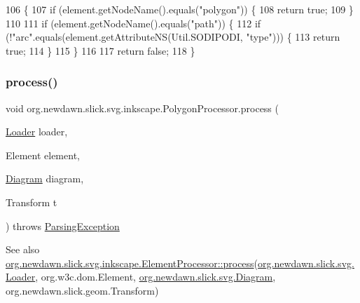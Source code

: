 \begin{DoxyCode}
106                                             \{
107         \textcolor{keywordflow}{if} (element.getNodeName().equals(\textcolor{stringliteral}{"polygon"})) \{
108             \textcolor{keywordflow}{return} \textcolor{keyword}{true};
109         \}
110         
111         \textcolor{keywordflow}{if} (element.getNodeName().equals(\textcolor{stringliteral}{"path"})) \{
112             \textcolor{keywordflow}{if} (!\textcolor{stringliteral}{"arc"}.equals(element.getAttributeNS(Util.SODIPODI, \textcolor{stringliteral}{"type"}))) \{
113                 \textcolor{keywordflow}{return} \textcolor{keyword}{true};
114             \}
115         \}
116         
117         \textcolor{keywordflow}{return} \textcolor{keyword}{false};
118     \}
\end{DoxyCode}
\mbox{\label{classorg_1_1newdawn_1_1slick_1_1svg_1_1inkscape_1_1_polygon_processor_afe4b2aaaa0651a682fad619a9dddf870}} 
\subsubsection{\texorpdfstring{process()}{process()}}
{\footnotesize\ttfamily void org.\+newdawn.\+slick.\+svg.\+inkscape.\+Polygon\+Processor.\+process (\begin{DoxyParamCaption}\item[{\mbox{\hyperlink{interfaceorg_1_1newdawn_1_1slick_1_1svg_1_1_loader}{Loader}}}]{loader,  }\item[{Element}]{element,  }\item[{\mbox{\hyperlink{classorg_1_1newdawn_1_1slick_1_1svg_1_1_diagram}{Diagram}}}]{diagram,  }\item[{Transform}]{t }\end{DoxyParamCaption}) throws \mbox{\hyperlink{classorg_1_1newdawn_1_1slick_1_1svg_1_1_parsing_exception}{Parsing\+Exception}}\hspace{0.3cm}{\ttfamily [inline]}}

\begin{DoxySeeAlso}{See also}
\mbox{\hyperlink{interfaceorg_1_1newdawn_1_1slick_1_1svg_1_1inkscape_1_1_element_processor_acd170a9e1119481edae885780db59a2e}{org.\+newdawn.\+slick.\+svg.\+inkscape.\+Element\+Processor\+::process}}(\mbox{\hyperlink{interfaceorg_1_1newdawn_1_1slick_1_1svg_1_1_loader}{org.\+newdawn.\+slick.\+svg.\+Loader}}, org.\+w3c.\+dom.\+Element, \mbox{\hyperlink{classorg_1_1newdawn_1_1slick_1_1svg_1_1_diagram}{org.\+newdawn.\+slick.\+svg.\+Diagram}}, org.\+newdawn.\+slick.\+geom.\+Transform) 
\end{DoxySeeAlso}


